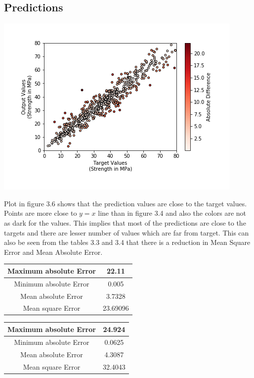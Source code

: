 \subsection{Predictions}
\begin{center}
	\includegraphics[scale=0.8]{images/comparison/comparison_a.png}
\end{center}
Plot in figure 3.6 shows that the prediction values are close to the target values. Points are more close to $y=x$ line than in figure 3.4 and also the colors are not as dark for the values.
This implies that most of the predictions are close to the targets and there are lesser number of values which are far from target. This can also be seen from the tables 3.3 and 3.4 that there is a reduction in Mean Square Error and Mean Absolute Error.
\begin{center}
	\begin{tabular}{|c|c|}
		\hline
		Maximum absolute Error & 22.11\\
		\hline
		Minimum absolute Error & 0.005\\
		\hline
		Mean absolute Error & 3.7328\\
		\hline
		Mean square Error & 23.69096\\
		\hline
	\end{tabular}
\end{center}
\begin{center}
	\begin{tabular}{|c|c|}
		\hline
		Maximum absolute Error & 24.924\\
		\hline
		Minimum absolute Error & 0.0625\\
		\hline
		Mean absolute Error & 4.3087\\
		\hline
		Mean square Error & 32.4043\\
		\hline
	\end{tabular}
\end{center}